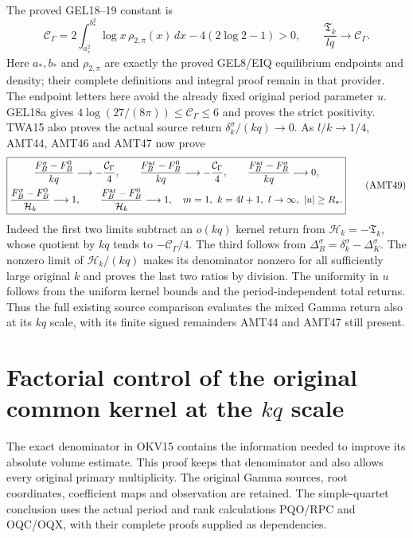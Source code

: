 \documentclass[11pt,a4paper]{article}
\begin{document}
The proved GEL18--19 constant is
\[
 \mathcal C_\Gamma=2\int_{a_*^2}^{b_*^2}\log x\,
                       \rho_{2,\pi}(x)\,dx-4(2\log2-1)>0,
 \qquad \frac{\mathfrak T_k}{lq}\longrightarrow\mathcal C_\Gamma.
 \tag{AMT48}
\]
Here $a_*,b_*$ and $\rho_{2,\pi}$ are exactly the proved GEL8/EIQ
equilibrium endpoints and density; their complete definitions and
integral proof remain in that provider. The endpoint letters here
avoid the already fixed original period parameter $u$. GEL18a
gives $4\log(27/(8\pi))\le\mathcal C_\Gamma\le6$ and proves
the strict positivity. TWA15 also proves the actual source return
$\delta_k^\sigma/(kq)\to0$. As $l/k\to1/4$, AMT44, AMT46
and AMT47 now prove
\[
\boxed{\begin{gathered}
 \frac{F_B^\sigma-F_B^0}{kq}\longrightarrow-\frac{\mathcal C_\Gamma}{4},
 \qquad
 \frac{F_B^{\rm ar}-F_B^0}{kq}\longrightarrow-\frac{\mathcal C_\Gamma}{4},
 \qquad
 \frac{F_B^{\rm ar}-F_B^\sigma}{kq}\longrightarrow0,\\
 \frac{F_B^\sigma-F_B^0}{\mathcal H_k}\longrightarrow1,
 \qquad
 \frac{F_B^{\rm ar}-F_B^0}{\mathcal H_k}\longrightarrow1,
 \quad m=1,\ k=4l+1,\ l\to\infty,\ |u|\ge R_*.
\end{gathered}}\tag{AMT49}
\]
Indeed the first two limits subtract an $o(kq)$ kernel return
from $\mathcal H_k=-\mathfrak T_k$, whose quotient by $kq$
tends to $-\mathcal C_\Gamma/4$. The third follows from
$\Delta_B^\sigma=\delta_k^\sigma-\Delta_K^\sigma$.
The nonzero limit of $\mathcal H_k/(kq)$ makes its denominator
nonzero for all sufficiently large original $k$ and proves the
last two ratios by division. The uniformity in $u$ follows from
the uniform kernel bounds and the period-independent total returns.
Thus the full existing source comparison evaluates the mixed
Gamma return also at its $kq$ scale, with its finite signed
remainders AMT44 and AMT47 still present.


\clearpage
\section{Factorial control of the original common kernel at the \texorpdfstring{$kq$}{kq} scale}
\label{sec:KAF}

The exact denominator in OKV15 contains the information needed to improve
its absolute volume estimate. This proof keeps that denominator and also
allows every original primary multiplicity. The original Gamma sources,
root coordinates, coefficient maps and observation are retained. The
simple-quartet conclusion uses the actual period and rank calculations
PQO/RPC and OQC/OQX, with their complete proofs supplied as dependencies.
\end{document}
